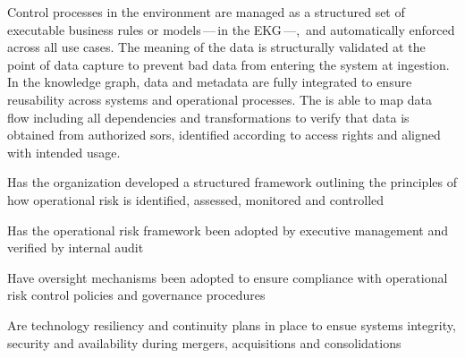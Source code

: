 %
%

\ekgmmCapabilitySectionContributionToEnterprise

Control processes in the  environment are managed as a structured set of executable business rules
or models\,---\,in the EKG\,---,\ and automatically enforced across all use cases.
The meaning of the data is structurally validated at the point of data capture to prevent bad data from
entering the system at ingestion.
In the knowledge graph, data and metadata are fully integrated to ensure reusability across systems
and operational processes.
The  is able to map data flow including all dependencies and transformations to verify that
data is obtained from authorized \glspl{sor}, identified according to access rights and
aligned with intended usage.

\ekgmmCapabilitySectionDimensions

\begin{core-questions}

  \item [\thesection.1] Has the organization developed a structured framework outlining the principles of how
                        operational risk is identified, assessed, monitored and controlled
  \item [\thesection.2] Has the operational risk framework been adopted by executive management and verified by
                        internal audit
  \item [\thesection.3] Have oversight mechanisms been adopted to ensure compliance with operational risk
                        control policies and governance procedures
  \item [\thesection.4] Are technology resiliency and continuity plans in place to ensue systems integrity,
                        security and availability during mergers, acquisitions and consolidations

\end{core-questions}

